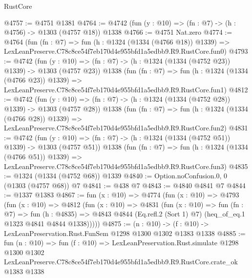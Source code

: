 \begin{lexlean}{RustCore}
\begin{coremodule}
@4757 := @4751 @1381
@4764 := @4742 (fun (y : @10) => (fn : @7) -> (h : @4756) -> @1303 (@4757 @18)) @1338
@4766 := @4751 Nat.zero
@4774 := @4764
    (fun (fn : @7) =>
    fun (h : @1324 (@1334 (@4766 @18)) @1339) =>
    LexLeanPreserve.C78c8ce54f7eb170d4e955bfd1a5edbb9.R9.RustCore.fun0)
@4793 := @4742
    (fun (y : @10) => (fn : @7) -> (h : @1324 (@1334 (@4752 @23)) @1339) -> @1303 (@4757 @23))
    @1338
    (fun (fn : @7) =>
    fun (h : @1324 (@1334 (@4766 @23)) @1339) =>
    LexLeanPreserve.C78c8ce54f7eb170d4e955bfd1a5edbb9.R9.RustCore.fun1)
@4812 := @4742
    (fun (y : @10) => (fn : @7) -> (h : @1324 (@1334 (@4752 @28)) @1339) -> @1303 (@4757 @28))
    @1338
    (fun (fn : @7) =>
    fun (h : @1324 (@1334 (@4766 @28)) @1339) =>
    LexLeanPreserve.C78c8ce54f7eb170d4e955bfd1a5edbb9.R9.RustCore.fun2)
@4831 := @4742
    (fun (y : @10) => (fn : @7) -> (h : @1324 (@1334 (@4752 @51)) @1339) -> @1303 (@4757 @51))
    @1338
    (fun (fn : @7) =>
    fun (h : @1324 (@1334 (@4766 @51)) @1339) =>
    LexLeanPreserve.C78c8ce54f7eb170d4e955bfd1a5edbb9.R9.RustCore.fun3)
@4835 := @1324 (@1334 (@4752 @68)) @1339
@4840 := Option.noConfusion.{0, 0} (@1303 (@4757 @68)) @7
@4841 := @438 @7
@4843 := @4840 @4841 @7
@4844 := @1337 @1383
@4867 := fun (x : @10) =>
  @4774
    (fun (x : @10) =>
    @4793
      (fun (x : @10) =>
      @4812
        (fun (x : @10) =>
        @4831
          (fun (x : @10) =>
          fun (fn : @7) =>
          fun (h : @4835) =>
          @4843 @4844 (Eq.refl.{2} (Sort 1) @7) (heq_of_eq.{1} @1323 @4841 @4844 @1338)))))
@4875 := (n : @10) -> (f : @10) -> LexLeanPreservation.Rust.FunSem @1298 @1300 @1302 @1383 @1338
@4885 := fun (n : @10) =>
  fun (f : @10) =>
  LexLeanPreservation.Rust.simulate
    @1298
    @1300
    @1302
    LexLeanPreserve.C78c8ce54f7eb170d4e955bfd1a5edbb9.R9.RustCore.crate_ok
    @1383
    @1338
\end{coremodule}
\end{lexlean}
